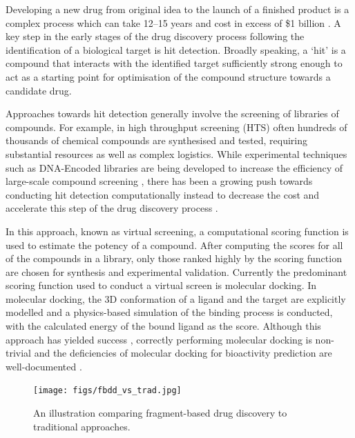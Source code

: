 \documentclass[journal=jacsat,manuscript=article]{achemso}
\begin{document}
Developing a new drug from original idea to the launch of a finished product is a complex process which can take 12–15 years and cost in excess of \$1 billion \cite{Hughes2011Principles}. A key step in the early stages of the drug discovery process following the identification of a biological target is hit detection. Broadly speaking, a `hit' is a compound that interacts with the identified target sufficiently strong enough to act as a starting point for optimisation of the compound structure towards a candidate drug. 

Approaches towards hit detection generally involve the screening of libraries of compounds. For example, in high throughput screening (HTS) often hundreds of thousands of chemical compounds are synthesised and tested, requiring substantial resources as well as complex logistics. While experimental techniques such as DNA-Encoded libraries are being developed to increase the efficiency of large-scale compound screening \cite{GirondaMartinez2021DNALibrary}, there has been a growing push towards conducting hit detection computationally instead to decrease the cost and accelerate this step of the drug discovery process \cite{?}. 

In this approach, known as virtual screening, a computational scoring function is used to estimate the potency of a compound. After computing the scores for all of the compounds in a library, only those ranked highly by the scoring function are chosen for synthesis and experimental validation. Currently the predominant scoring function used to conduct a virtual screen is molecular docking. In molecular docking, the 3D conformation of a ligand and the target are explicitly modelled and a physics-based simulation of the binding process is conducted, with the calculated energy of the bound ligand as the score. Although this approach has yielded success \cite{Lyu2019UltraLargeDocking,Alon2021SigmaTwo}, correctly performing molecular docking is non-trivial and the deficiencies of molecular docking for bioactivity prediction are well-documented \cite{Llanos2021StrengthsAndWeaknesses, Macip2022HasteMakesWaste}.


\begin{figure}
    \centering
    \texttt{[image: figs/fbdd\_vs\_trad.jpg]}
    \caption{An illustration comparing fragment-based drug discovery to traditional approaches.}
    \label{fig:fbdd}
\end{figure}
\end{document}
